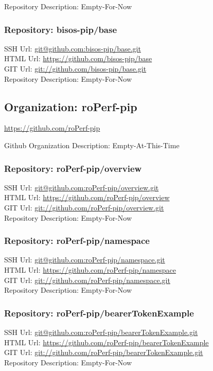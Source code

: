 Repository Description: Empty-For-Now

\subsubsection{Repository: bisos-pip/base}

SSH Url:  \url{git@github.com:bisos-pip/base.git}\\
HTML Url: \url{https://github.com/bisos-pip/base}\\
GIT Url:  \url{git://github.com/bisos-pip/base.git}\\


Repository Description: Empty-For-Now

\subsection{Organization: roPerf-pip}

\url{https://github.com/roPerf-pip}

Github Organization Description: Empty-At-This-Time

\subsubsection{Repository: roPerf-pip/overview}

SSH Url:  \url{git@github.com:roPerf-pip/overview.git}\\
HTML Url: \url{https://github.com/roPerf-pip/overview}\\
GIT Url:  \url{git://github.com/roPerf-pip/overview.git}\\


Repository Description: Empty-For-Now

\subsubsection{Repository: roPerf-pip/namespace}

SSH Url:  \url{git@github.com:roPerf-pip/namespace.git}\\
HTML Url: \url{https://github.com/roPerf-pip/namespace}\\
GIT Url:  \url{git://github.com/roPerf-pip/namespace.git}\\


Repository Description: Empty-For-Now

\subsubsection{Repository: roPerf-pip/bearerTokenExample}

SSH Url:  \url{git@github.com:roPerf-pip/bearerTokenExample.git}\\
HTML Url: \url{https://github.com/roPerf-pip/bearerTokenExample}\\
GIT Url:  \url{git://github.com/roPerf-pip/bearerTokenExample.git}\\


Repository Description: Empty-For-Now
